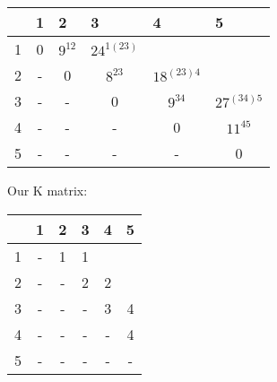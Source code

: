 \documentclass[12pt]{article}
\begin{document}
\begin{table}[h]
\centering
\begin{tabular}{|c|c|c|c|c|c|}
\hline
\multicolumn{1}{|l|}{} & \multicolumn{1}{|l|}{1} & \multicolumn{1}{l|}{2} & \multicolumn{1}{l|}{3} & \multicolumn{1}{l|}{4} & \multicolumn{1}{l|}{5} \\ \hline
1&0                       &       $9^{12} $              &         $24^{1(23)}$              &                       &                   \\ \hline
2&-                       & 0                     &    $8^{23}$                   &    $18^{(23)4} $                  &                   \\ \hline
3&-                       & -                     & 0                     &      $ 9^{34} $                 &   $27^{(34)5}$                    \\ \hline
4&-                       & -                     & -                     & 0                     &        $11^{45}$                 \\ \hline
5&-                       & -                     & -                     & -                     &    0                   \\ \hline
\end{tabular}
\end{table}
Our K matrix:\\
\begin{table}[h]
\centering
\begin{tabular}{|c|c|c|c|c|c|}
\hline
\multicolumn{1}{|l|}{} & \multicolumn{1}{|l|}{1} & \multicolumn{1}{l|}{2} & \multicolumn{1}{l|}{3} & \multicolumn{1}{l|}{4} & \multicolumn{1}{l|}{5} \\ \hline
1&  -                   &     1                 &       1               &                      &                   \\ \hline
2&-                       & -                     &      2                 &       2               &                   \\ \hline
3&-                       & -                     & -                     &     3                  &      4                 \\ \hline
4&-                       & -                     & -                     & -                     &   4                    \\ \hline
5&-                       & -                     & -                     & -                     &   -                   \\ \hline
\end{tabular}
\end{table}
\end{document}
